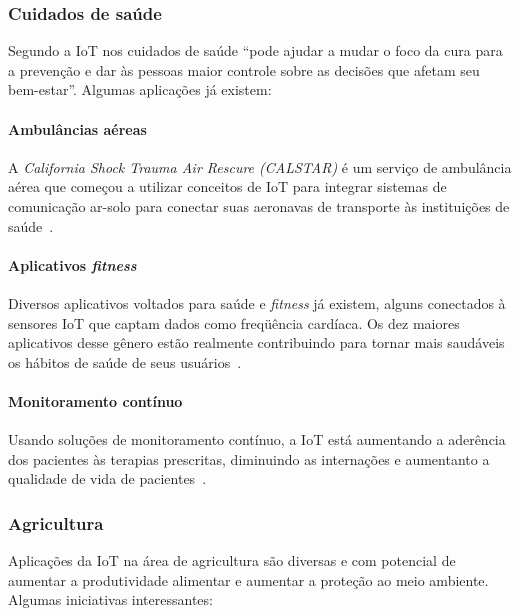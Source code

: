 \documentclass[pdftex, brazil, 12pt, twoside]{article}
\newcommand{\ingles}[1]{\textit{#1}}
\begin{document}
\subsubsection{Cuidados de saúde}
\label{aplicacoes-iot-exemplos-saude}

Segundo \citet{UKGOSWalportIoT2014} a IoT nos cuidados de saúde ``pode ajudar
a mudar o foco da cura para a prevenção e dar às pessoas maior controle sobre
as decisões que afetam seu bem-estar''. Algumas aplicações já existem:

\paragraph{Ambulâncias aéreas} A \ingles{California Shock Trauma Air Rescure (CALSTAR)}
é um serviço de ambulância aérea que começou a utilizar conceitos de IoT para
integrar sistemas de comunicação ar-solo para conectar suas aeronavas de
transporte às instituições de saúde~\citep{CiscoCALSTAR}.

\paragraph{Aplicativos \emph{fitness}} Diversos aplicativos voltados para saúde
e \emph{fitness} já existem, alguns conectados à sensores IoT que captam
dados como freqüência cardíaca. Os dez maiores aplicativos desse gênero
estão realmente contribuindo para tornar mais saudáveis os hábitos
de saúde de seus usuários~\citep{OliverWymanIoT2015}.

\paragraph{Monitoramento contínuo} Usando soluções de monitoramento contínuo,
a IoT está aumentando a aderência dos pacientes às terapias prescritas, diminuindo
as internações e aumentanto a qualidade de vida de pacientes~\citep{McKinseyIoTHype}.


\subsubsection{Agricultura}
\label{aplicacoes-iot-exemplos-agricultura}

Aplicações da IoT na área de agricultura são diversas e com potencial de aumentar
a produtividade alimentar e aumentar a proteção ao meio ambiente. Algumas
iniciativas interessantes:
\end{document}
